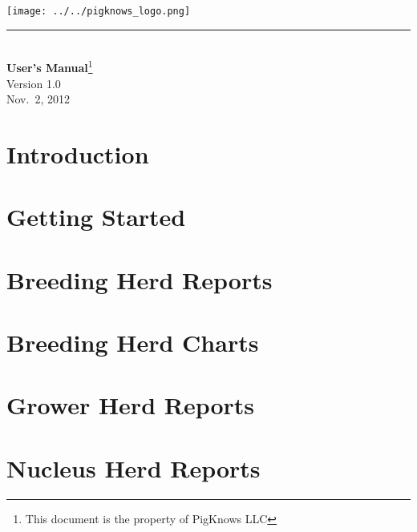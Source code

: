 \documentclass{book}
\begin{document}
\hypersetup{pageanchor=false,citecolor=blue}
\begin{titlepage}
    \vspace*{1.0in}
    \begin{flushright}
    \texttt{[image: ../../pigknows\_logo.png]}
          {\rule[.1in]{5.0in}{.02in}}\\[.25cm]
          {\Huge\bf User's Manual}\footnote{
            This document is the property of PigKnows LLC} \\[1in]
          {Version 1.0} \\
          {Nov.\ 2, 2012}
    \end{flushright}
\end{titlepage}
\clearemptydoublepage
{}
\tableofcontents
\clearemptydoublepage
{}
\hypersetup{pageanchor=true,citecolor=blue}
%
%
\chapter{Introduction}
\label{index}
\hypertarget{index}{}

%
%
\chapter{Getting Started}
\label{getting_started}
\hypertarget{getting_started}{}

%
%
\chapter{Breeding Herd Reports}
\label{breeding_herd_reports}
\hypertarget{breeding_herd_reports}{}

%
%
\chapter{Breeding Herd Charts}
\label{breeding_herd_charts}
\hypertarget{breeding_herd_charts}{}

%
%
\chapter{Grower Herd Reports}
\label{grower_herd_reports}
\hypertarget{grower_herd_reports}{}

%
%
\chapter{Nucleus Herd Reports}
\label{nucleus_herd_reports}
\hypertarget{nucleus_herd_reports}{}

%
%
\end{document}
